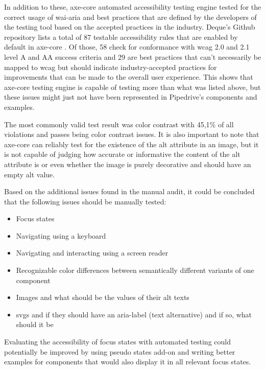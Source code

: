 \documentclass{master_thesis}
\begin{document}
In addition to these, axe-core automated accessibility testing engine tested for the correct usage of \ac{wai-aria} and best practices that are defined by the developers of the testing tool based on the accepted practices in the industry. Deque's Github repository lists a total of 87 testable accessibility rules that are enabled by default in axe-core \citep{Fiers2023}. Of those, 58 check for conformance with \ac{wcag} 2.0 and 2.1 level A and AA success criteria and 29 are best practices that can't necessarily be mapped to \ac{wcag} but should indicate industry-accepted practices for improvements that can be made to the overall user experience. This shows that axe-core testing engine is capable of testing more than what was listed above, but these issues might just not have been represented in Pipedrive's components and examples.

The most commonly valid test result was color contrast with 45,1\% of all violations and passes being color contrast issues. It is also important to note that axe-core can reliably test for the existence of the alt attribute in an image, but it is not capable of judging how accurate or informative the content of the alt attribute is or even whether the image is purely decorative and should have an empty alt value.

Based on the additional issues found in the manual audit, it could be concluded that the following issues should be manually tested:
\begin{itemize}
	\item Focus states
	\item Navigating using a keyboard
	\item Navigating and interacting using a screen reader
	\item Recognizable color differences between semantically different variants of one component
	\item Images and what should be the values of their alt texts
	\item \ac{svg}s and if they should have an aria-label (text alternative) and if so, what should it be
\end{itemize}

Evaluating the accessibility of focus states with automated testing could potentially be improved by using pseudo states add-on and writing better examples for components that would also display it in all relevant focus states.
\end{document}
